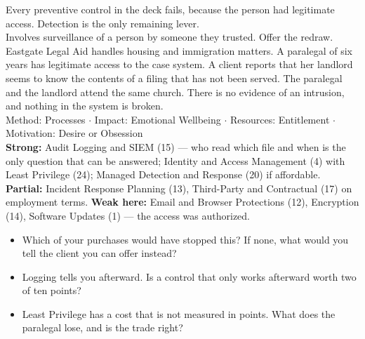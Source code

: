  Every preventive control in the deck fails, because the
person had legitimate access. Detection is the only remaining lever.\\
 Involves surveillance of a person by someone they trusted.
Offer the redraw.\\
 Eastgate Legal Aid handles housing and immigration matters. A
paralegal of six years has legitimate access to the case system. A client
reports that her landlord seems to know the contents of a filing that has not
been served. The paralegal and the landlord attend the same church. There is no
evidence of an intrusion, and nothing in the system is broken.\\
 Method: Processes $\cdot$ Impact:
Emotional Wellbeing $\cdot$ Resources: Entitlement $\cdot$ Motivation: Desire or
Obsession\\
 \textbf{Strong:} Audit Logging and SIEM (15) --- who read which
file and when is the only question that can be answered; Identity and Access
Management (4) with Least Privilege (24); Managed Detection and Response (20) if
affordable. \textbf{Partial:} Incident Response Planning (13), Third-Party and
Contractual (17) on employment terms. \textbf{Weak here:} Email and Browser
Protections (12), Encryption (14), Software Updates (1) --- the access was
authorized.\\
\begin{itemize}
\item Which of your purchases would have stopped this? If none, what would you
tell the client you can offer instead?
\item Logging tells you afterward. Is a control that only works afterward worth
two of ten points?
\item Least Privilege has a cost that is not measured in points. What does the
paralegal lose, and is the trade right?
\end{itemize}

